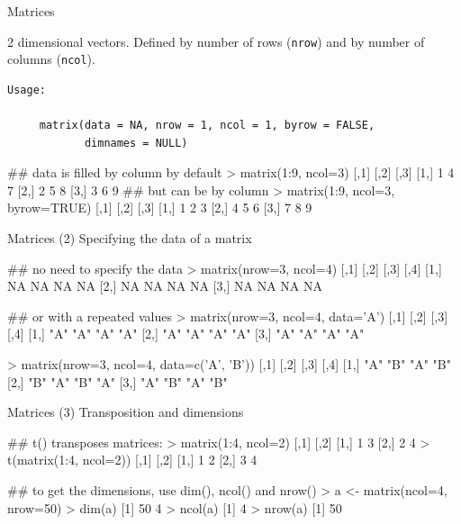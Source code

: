 \documentclass[pdf]{beamer}
\begin{document}
\begin{frame}[fragile]{Matrices}
  
  { \small
  2 dimensional vectors. Defined by number of rows (\texttt{nrow})
  and by number of columns (\texttt{ncol}).

  \begin{verbatim}
Usage:

     matrix(data = NA, nrow = 1, ncol = 1, byrow = FALSE,
            dimnames = NULL)
\end{verbatim}
}
  \begin{rcode}
    ## data is filled by column by default
    > matrix(1:9, ncol=3)
         [,1] [,2] [,3]
    [1,]    1    4    7
    [2,]    2    5    8
    [3,]    3    6    9
    ## but can be by column
    > matrix(1:9, ncol=3, byrow=TRUE)
         [,1] [,2] [,3]
    [1,]    1    2    3
    [2,]    4    5    6
    [3,]    7    8    9

  \end{rcode}
\end{frame}

\begin{frame}[fragile]{Matrices (2)}
  Specifying the data of a matrix

  \begin{rcode}
    ## no need to specify the data
    > matrix(nrow=3, ncol=4)
         [,1] [,2] [,3] [,4]
    [1,]   NA   NA   NA   NA
    [2,]   NA   NA   NA   NA
    [3,]   NA   NA   NA   NA

    ## or with a repeated values
    > matrix(nrow=3, ncol=4, data='A')
        [,1] [,2] [,3] [,4]
    [1,] "A"  "A"  "A"  "A" 
    [2,] "A"  "A"  "A"  "A" 
    [3,] "A"  "A"  "A"  "A" 

    > matrix(nrow=3, ncol=4, data=c('A', 'B'))
        [,1] [,2] [,3] [,4]
    [1,] "A"  "B"  "A"  "B" 
    [2,] "B"  "A"  "B"  "A" 
    [3,] "A"  "B"  "A"  "B" 

  \end{rcode}

\end{frame}

\begin{frame}[fragile]{Matrices (3)}
  Transposition and dimensions

  \begin{rcode}
    ## t() transposes matrices:
    > matrix(1:4, ncol=2)
          [,1] [,2]
    [1,]    1    3
    [2,]    2    4
    > t(matrix(1:4, ncol=2))
         [,1] [,2]
    [1,]    1    2
    [2,]    3    4

    ## to get the dimensions, use dim(), ncol() and nrow()
    > a <- matrix(ncol=4, nrow=50)
    > dim(a)
    [1] 50  4
    > ncol(a)
    [1] 4
    > nrow(a)
    [1] 50
  \end{rcode}
\end{frame}
\end{document}
